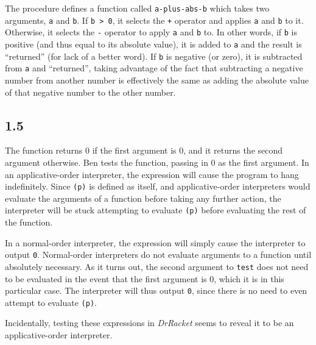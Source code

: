 \documentclass{article}
\begin{document}

\noindent The procedure defines a function called \texttt{a-plus-abs-b} which takes two arguments, \texttt{a} and \texttt{b}. If \texttt{b > 0}, it selects the \texttt{+} operator and applies \texttt{a} and \texttt{b} to it. Otherwise, it selects the \texttt{-} operator to apply \texttt{a} and \texttt{b} to. In other words, if \texttt{b} is positive (and thus equal to its absolute value), it is added to \texttt{a} and the result is ``returned'' (for lack of a better word). If \texttt{b} is negative (or zero), it is subtracted from \texttt{a} and ``returned'', taking advantage of the fact that subtracting a negative number from another number is effectively the same as adding the absolute value of that negative number to the other number.

\subsection*{1.5}

\noindent The function returns 0 if the first argument is 0, and it returns the second argument otherwise. Ben tests the function, passing in 0 as the first argument. In an applicative-order interpreter, the expression will cause the program to hang indefinitely. Since \texttt{(p)} is defined as itself, and applicative-order interpreters would evaluate the arguments of a function before taking any further action, the interpreter will be stuck attempting to evaluate \texttt{(p)} before evaluating the rest of the function.

\noindent In a normal-order interpreter, the expression will simply cause the interpreter to output \texttt{0}. Normal-order interpreters do not evaluate arguments to a function until absolutely necessary. As it turns out, the second argument to \texttt{test} does not need to be evaluated in the event that the first argument is 0, which it is in this particular case. The interpreter will thus output \texttt{0}, since there is no need to even attempt to evaluate \texttt{(p)}.

\noindent Incidentally, testing these expressions in \textit{DrRacket} seems to reveal it to be an applicative-order interpreter.
\end{document}
